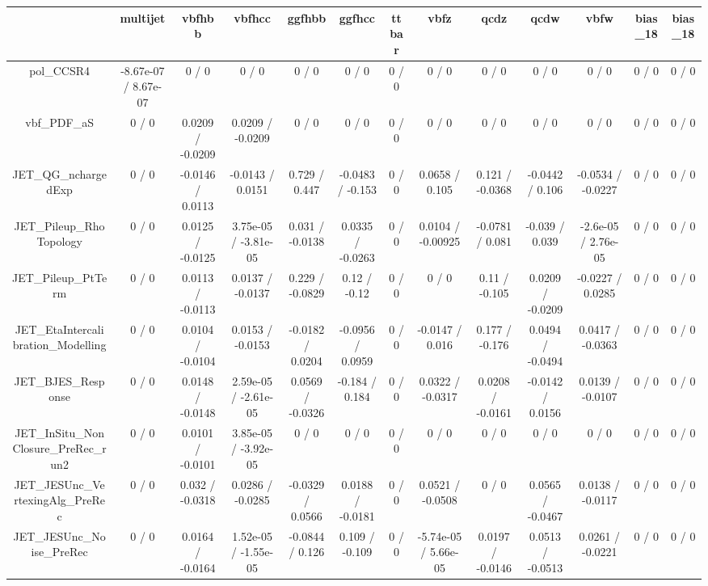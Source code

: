 \documentclass[10pt]{article}
\begin{document}
\begin{table}[htbp]
\begin{center}
\begin{tabular}{|c|c|c|c|c|c|c|c|c|c|c|c|c|}
\hline 
      & multijet      & vbfhbb      & vbfhcc      & ggfhbb      & ggfhcc      & ttbar      & vbfz      & qcdz      & qcdw      & vbfw      & bias_18      & bias_18 \\ 
\hline 
  pol_CCSR4 & -8.67e-07 / 8.67e-07 & 0 / 0 & 0 / 0 & 0 / 0 & 0 / 0 & 0 / 0 & 0 / 0 & 0 / 0 & 0 / 0 & 0 / 0 & 0 / 0 & 0 / 0 \\ 
  vbf_PDF_aS & 0 / 0 & 0.0209 / -0.0209 & 0.0209 / -0.0209 & 0 / 0 & 0 / 0 & 0 / 0 & 0 / 0 & 0 / 0 & 0 / 0 & 0 / 0 & 0 / 0 & 0 / 0 \\ 
  JET_QG_nchargedExp & 0 / 0 & -0.0146 / 0.0113 & -0.0143 / 0.0151 & 0.729 / 0.447 & -0.0483 / -0.153 & 0 / 0 & 0.0658 / 0.105 & 0.121 / -0.0368 & -0.0442 / 0.106 & -0.0534 / -0.0227 & 0 / 0 & 0 / 0 \\ 
  JET_Pileup_RhoTopology & 0 / 0 & 0.0125 / -0.0125 & 3.75e-05 / -3.81e-05 & 0.031 / -0.0138 & 0.0335 / -0.0263 & 0 / 0 & 0.0104 / -0.00925 & -0.0781 / 0.081 & -0.039 / 0.039 & -2.6e-05 / 2.76e-05 & 0 / 0 & 0 / 0 \\ 
  JET_Pileup_PtTerm & 0 / 0 & 0.0113 / -0.0113 & 0.0137 / -0.0137 & 0.229 / -0.0829 & 0.12 / -0.12 & 0 / 0 & 0 / 0 & 0.11 / -0.105 & 0.0209 / -0.0209 & -0.0227 / 0.0285 & 0 / 0 & 0 / 0 \\ 
  JET_EtaIntercalibration_Modelling & 0 / 0 & 0.0104 / -0.0104 & 0.0153 / -0.0153 & -0.0182 / 0.0204 & -0.0956 / 0.0959 & 0 / 0 & -0.0147 / 0.016 & 0.177 / -0.176 & 0.0494 / -0.0494 & 0.0417 / -0.0363 & 0 / 0 & 0 / 0 \\ 
  JET_BJES_Response & 0 / 0 & 0.0148 / -0.0148 & 2.59e-05 / -2.61e-05 & 0.0569 / -0.0326 & -0.184 / 0.184 & 0 / 0 & 0.0322 / -0.0317 & 0.0208 / -0.0161 & -0.0142 / 0.0156 & 0.0139 / -0.0107 & 0 / 0 & 0 / 0 \\ 
  JET_InSitu_NonClosure_PreRec_run2 & 0 / 0 & 0.0101 / -0.0101 & 3.85e-05 / -3.92e-05 & 0 / 0 & 0 / 0 & 0 / 0 & 0 / 0 & 0 / 0 & 0 / 0 & 0 / 0 & 0 / 0 & 0 / 0 \\ 
  JET_JESUnc_VertexingAlg_PreRec & 0 / 0 & 0.032 / -0.0318 & 0.0286 / -0.0285 & -0.0329 / 0.0566 & 0.0188 / -0.0181 & 0 / 0 & 0.0521 / -0.0508 & 0 / 0 & 0.0565 / -0.0467 & 0.0138 / -0.0117 & 0 / 0 & 0 / 0 \\ 
  JET_JESUnc_Noise_PreRec & 0 / 0 & 0.0164 / -0.0164 & 1.52e-05 / -1.55e-05 & -0.0844 / 0.126 & 0.109 / -0.109 & 0 / 0 & -5.74e-05 / 5.66e-05 & 0.0197 / -0.0146 & 0.0513 / -0.0513 & 0.0261 / -0.0221 & 0 / 0 & 0 / 0 \\ 

\end{tabular}
\end{center}
\end{table}
\end{document}
